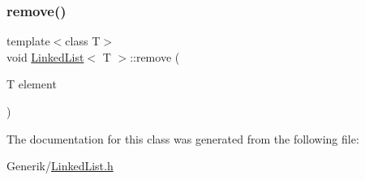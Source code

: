 \mbox{\label{classLinkedList_a6c4973ae9956ddb037a9093cffa2adb1}} 
\subsubsection{\texorpdfstring{remove()}{remove()}\hspace{0.1cm}{\footnotesize\ttfamily [2/2]}}
{\footnotesize\ttfamily template$<$class T$>$ \\
void \mbox{\hyperlink{classLinkedList}{Linked\+List}}$<$ T $>$\+::remove (\begin{DoxyParamCaption}\item[{T}]{element }\end{DoxyParamCaption})}



The documentation for this class was generated from the following file\+:\begin{DoxyCompactItemize}
\item 
Generik/\mbox{\hyperlink{Generik_2LinkedList_8h}{Linked\+List.\+h}}\end{DoxyCompactItemize}
